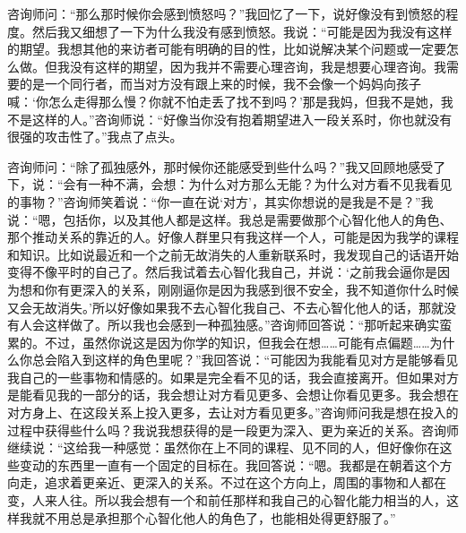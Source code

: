 咨询师问：“那么那时候你会感到愤怒吗？”我回忆了一下，说好像没有到愤怒的程度。然后我又细想了一下为什么我没有感到愤怒。我说：“可能是因为我没有这样的期望。我想其他的来访者可能有明确的目的性，比如说解决某个问题或一定要怎么做。但我没有这样的期望，因为我并不需要心理咨询，我是想要心理咨询。我需要的是一个同行者，而当对方没有跟上来的时候，我不会像一个妈妈向孩子喊：‘你怎么走得那么慢？你就不怕走丢了找不到吗？’那是我妈，但我不是她，我不是这样的人。”咨询师说：“好像当你没有抱着期望进入一段关系时，你也就没有很强的攻击性了。”我点了点头。

咨询师问：“除了孤独感外，那时候你还能感受到些什么吗？”我又回顾地感受了下，说：“会有一种不满，会想：为什么对方那么无能？为什么对方看不见我看见的事物？”咨询师笑着说：“你一直在说‘对方’，其实你想说的是我是不是？”我说：“嗯，包括你，以及其他人都是这样。我总是需要做那个心智化他人的角色、那个推动关系的靠近的人。好像人群里只有我这样一个人，可能是因为我学的课程和知识。比如说最近和一个之前无故消失的人重新联系时，我发现自己的话语开始变得不像平时的自己了。然后我试着去心智化我自己，并说：‘之前我会逼你是因为想和你有更深入的关系，刚刚逼你是因为我感到很不安全，我不知道你什么时候又会无故消失。’所以好像如果我不去心智化我自己、不去心智化他人的话，那就没有人会这样做了。所以我也会感到一种孤独感。”咨询师回答说：“那听起来确实蛮累的。不过，虽然你说这是因为你学的知识，但我会在想……可能有点偏题……为什么你总会陷入到这样的角色里呢？”我回答说：“可能因为我能看见对方是能够看见我自己的一些事物和情感的。如果是完全看不见的话，我会直接离开。但如果对方是能看见我的一部分的话，我会想让对方看见更多、会想让你看见更多。我会想在对方身上、在这段关系上投入更多，去让对方看见更多。”咨询师问我是想在投入的过程中获得些什么吗？我说我想获得的是一段更为深入、更为亲近的关系。咨询师继续说：“这给我一种感觉：虽然你在上不同的课程、见不同的人，但好像你在这些变动的东西里一直有一个固定的目标在。我回答说：“嗯。我都是在朝着这个方向走，追求着更亲近、更深入的关系。不过在这个方向上，周围的事物和人都在变，人来人往。所以我会想有一个和前任那样和我自己的心智化能力相当的人，这样我就不用总是承担那个心智化他人的角色了，也能相处得更舒服了。”


